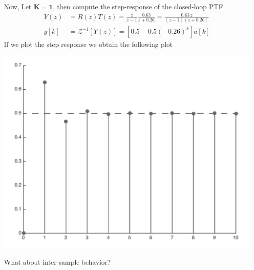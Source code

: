 \documentclass[twoside]{article}
\begin{document}
Now, Let $\mathbf{K = 1}$, then compute the step-response of the closed-loop PTF
%
\begin{align*}
Y(z) &= R(z) T(z) = \frac{z}{z-1} \frac{0.63}{z + 0.26} =
  \frac{0.63 \, z}{(z-1)(z+0.26)}
\\
y[k] &= \mathcal{Z}^{-1} [ Y(z) ] = \left[  0.5 - 0.5 (-0.26)^k
  \right] u[k]
\end{align*}
%
If we plot the step response we obtain the following plot
%
    \begin{center}
\begin{minipage}[h]{0.5\linewidth}
    \begin{center}
      \includegraphics[width=\textwidth]{step}
    \end{center}
\end{minipage}
    \end{center}
%
What about inter-sample behavior? 
\end{document}
